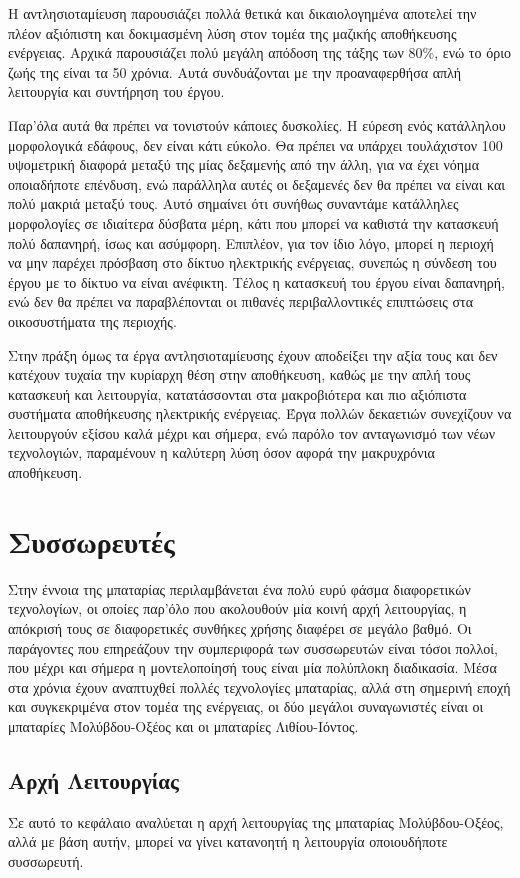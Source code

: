 \documentclass[12pt]{report}
\begin{document}
Η αντλησιοταμίευση παρουσιάζει πολλά θετικά και δικαιολογημένα αποτελεί την πλέον αξιόπιστη και δοκιμασμένη λύση στον τομέα της μαζικής αποθήκευσης ενέργειας. Αρχικά παρουσιάζει πολύ μεγάλη απόδοση της τάξης των 80\%, 
ενώ το όριο ζωής της είναι τα 50 χρόνια. Αυτά συνδυάζονται με την προαναφερθήσα απλή λειτουργία και συντήρηση του έργου.

Παρ'όλα αυτά θα πρέπει να τονιστούν κάποιες δυσκολίες. Η εύρεση ενός κατάλληλου μορφολογικά εδάφους, δεν είναι κάτι εύκολο. Θα πρέπει να υπάρχει τουλάχιστον 100{} υψομετρική διαφορά μεταξύ της μίας δεξαμενής 
από την άλλη, για να έχει νόημα οποιαδήποτε επένδυση, ενώ παράλληλα αυτές οι δεξαμενές δεν θα πρέπει να είναι και πολύ μακριά μεταξύ τους. Αυτό σημαίνει ότι συνήθως συναντάμε κατάλληλες μορφολογίες σε ιδιαίτερα δύσβατα μέρη, 
κάτι που μπορεί να καθιστά την κατασκευή πολύ δαπανηρή, ίσως και ασύμφορη. Επιπλέον, για τον ίδιο λόγο, μπορεί η περιοχή να μην παρέχει πρόσβαση στο δίκτυο ηλεκτρικής ενέργειας, συνεπώς η σύνδεση του έργου με το δίκτυο να είναι 
ανέφικτη. Τέλος η κατασκευή του έργου είναι δαπανηρή, ενώ δεν θα πρέπει να παραβλέπονται οι πιθανές περιβαλλοντικές επιπτώσεις στα οικοσυστήματα της περιοχής.

Στην πράξη όμως τα έργα αντλησιοταμίευσης έχουν αποδείξει την αξία τους και δεν κατέχουν τυχαία την κυρίαρχη θέση στην αποθήκευση, καθώς με την απλή τους κατασκευή και λειτουργία, 
κατατάσσονται στα μακροβιότερα και πιο αξιόπιστα συστήματα αποθήκευσης ηλεκτρικής ενέργειας. Έργα πολλών δεκαετιών συνεχίζουν να λειτουργούν εξίσου καλά μέχρι και σήμερα, ενώ παρόλο τον ανταγωνισμό των νέων τεχνολογιών,
παραμένουν η καλύτερη λύση όσον αφορά την μακρυχρόνια αποθήκευση.
\section{Συσσωρευτές}
Στην έννοια της μπαταρίας περιλαμβάνεται ένα πολύ ευρύ φάσμα διαφορετικών τεχνολογίων, οι οποίες παρ'όλο που ακολουθούν μία κοινή αρχή λειτουργίας, η απόκρισή τους σε διαφορετικές συνθήκες χρήσης διαφέρει σε μεγάλο βαθμό. 
Οι παράγοντες που επηρεάζουν την συμπεριφορά των συσσωρευτών είναι τόσοι πολλοί, που μέχρι και σήμερα η μοντελοποίησή τους είναι μία πολύπλοκη διαδικασία. Μέσα στα χρόνια έχουν αναπτυχθεί πολλές τεχνολογίες μπαταρίας, 
αλλά στη σημερινή εποχή και συγκεκριμένα στον τομέα της ενέργειας, οι δύο μεγάλοι συναγωνιστές είναι οι μπαταρίες Μολύβδου-Οξέος και οι μπαταρίες Λιθίου-Ιόντος.
\subsection{Αρχή Λειτουργίας}
Σε αυτό το κεφάλαιο αναλύεται η αρχή λειτουργίας της μπαταρίας Μολύβδου-Οξέος, αλλά με βάση αυτήν, μπορεί να γίνει κατανοητή η λειτουργία οποιουδήποτε συσσωρευτή. 
\end{document}
